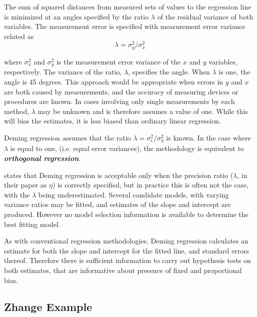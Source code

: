 \documentclass[12pt, a4paper]{report}
\theoremstyle{plain}
\theoremstyle{definition}
\theoremstyle{remark}
\begin{document}
	The sum of squared distances from measured sets of values to the regression line is minimized at an angles specified by the ratio $\lambda$ of the residual variance of both variables. The measurement error is specified with measurement error variance related as 
	\[\lambda = \sigma^2_y/\sigma^2_x\]
	
	where $\sigma^2_x$ and $\sigma^2_y$ is the measurement error variance of the $x$ and $y$ variables, respectively.
	The variance of the ratio, $\lambda$, specifies the angle.  When $\lambda$ is one, the angle is 45 degrees. 
	This approach would be appropriate when errors in $y$ and $x$ are both caused by measurements, and the accuracy of measuring devices or procedures are known. In cases involving only single measurements by each method, $\lambda$ may be unknown and is therefore assumes a value of one. While this will bias the estimates, it is less biased than ordinary linear regression.
	
	Deming regression assumes that the ratio $\lambda = \sigma^2_{\epsilon}/\sigma^2_{\eta}$ is known. In the case where $\lambda$ is equal to one, (i.e. equal error variances), the methodology is equivalent to \textit{\textbf{orthogonal regression}}.
	
	
	\citet{CarollRupert} states that Deming
	regression is acceptable only when the precision ratio ($\lambda$, in their paper as $\eta$) is correctly specified, but in practice this is often not the case, with the $\lambda$ being underestimated. Several candidate models, with varying variance ratios may be fitted, and estimates of the slope and intercept are produced. However no model selection information is available to determine the best fitting model.
	
	
	As with conventional regression methodologies, Deming regression calculates an estimate for both the slope and intercept for the
	fitted line, and standard errors thereof. Therefore there is sufficient information to carry out hypothesis tests on both
	estimates, that are informative about presence of fixed and proportional bias.
	


	
	

	
	
	
	
	
	
	\subsection{Zhange Example}
	
\end{document}

